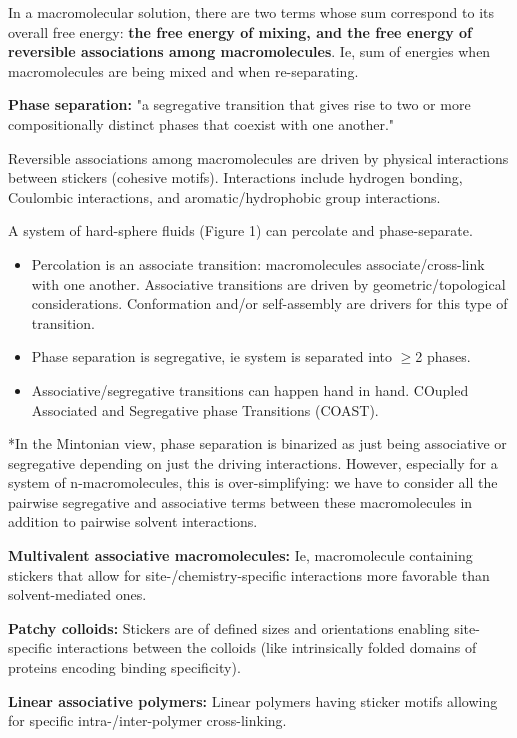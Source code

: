 \documentclass{article}
\begin{document}
In a macromolecular solution, there are two terms whose sum correspond to its overall free energy: \textbf{the free energy of mixing, and the free energy of reversible associations among macromolecules}. Ie, sum of energies when macromolecules are being mixed and when re-separating.

\textbf{Phase separation: } "a segregative transition that gives rise to two or more compositionally distinct phases that coexist with one another."

Reversible associations among macromolecules are driven by physical interactions between stickers (cohesive motifs). Interactions include hydrogen bonding, Coulombic interactions, and aromatic/hydrophobic group interactions.

A system of hard-sphere fluids (Figure 1) can percolate and phase-separate.

\begin{itemize}
    \item Percolation is an associate transition: macromolecules associate/cross-link with one another. Associative transitions are driven by geometric/topological considerations. Conformation and/or self-assembly are drivers for this type of transition.
    \item Phase separation is segregative, ie system is separated into $\geq$2 phases.
    \item Associative/segregative transitions can happen hand in hand. COupled Associated and Segregative phase Transitions (COAST).
\end{itemize}

*In the Mintonian view, phase separation is binarized as just being associative or segregative depending on just the driving interactions. However, especially for a system of n-macromolecules, this is over-simplifying: we have to consider all the pairwise segregative and associative terms between these macromolecules in addition to pairwise solvent interactions.

\textbf{Multivalent associative macromolecules: } Ie, macromolecule containing stickers that allow for site-/chemistry-specific interactions more favorable than solvent-mediated ones.

\textbf{Patchy colloids: } Stickers are of defined sizes and orientations enabling site-specific interactions between the colloids (like intrinsically folded domains of proteins encoding binding specificity).

\textbf{Linear associative polymers: } Linear polymers having sticker motifs allowing for specific intra-/inter-polymer cross-linking.
\end{document}
